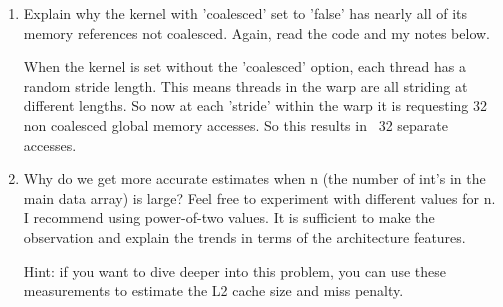 \documentclass{article}
\newenvironment{answer}
{\par\color{blue}}
{\normalfont\par}
\begin{document}
\begin{enumerate}
\begin{enumerate}
              \item Explain why the kernel with 'coalesced' set to 'false' has nearly all
                    of its memory references not coalesced. Again, read the code and my notes
                    below.

                    \begin{answer}
                        When the kernel is set without the 'coalesced' option, each thread has a random stride length.
                        This means threads in the warp are all striding at different lengths. So now at each 'stride' within the
                        warp it is requesting 32 non coalesced global memory accesses. So this results in ~32 separate accesses.
                    \end{answer}

              \item Why do we get more accurate estimates when n (the number of int's in
                    the main data array) is large? Feel free to experiment with different
                    values for n. I recommend using power-of-two values. It is sufficient
                    to make the observation and explain the trends in terms of the architecture
                    features.
                    \par
                    Hint: if you want to dive deeper into this problem, you can use these
                    measurements to estimate the L2 cache size and miss penalty.


\end{enumerate}
\end{enumerate}
\end{document}
